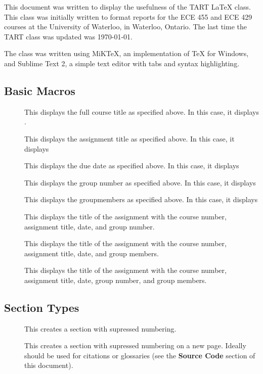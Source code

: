 \documentclass{technical_assignment_report}
\begin{document}
\fulltitle

\brief

This document was written to display the usefulness of the TART {\LaTeX} class. This class was initially written to format reports for the ECE 455 and ECE 429 courses at the University of Waterloo, in Waterloo, Ontario. The last time the TART class was updated was \today.


\environment

The class was written using MiKTeX, an implementation of {\TeX} for Windows, and Sublime Text 2, a simple text editor with tabs and syntax highlighting.



\subsection*{Basic Macros}
\begin{description}
\item[] This displays the full course title as specified above. In this case, it displays {\course}.
\item[] This displays the assignment title as specified above. In this case, it displays {\it\assignment}
\item[] This displays the due date as specified above. In this case, it displays {\duedate}
\item[] This displays the group number as specified above. In this case, it displays {\group}
\item[] This displays the groupmembers as specified above. In this case, it displays {\it\groupmem}
\item[] This displays the title of the assignment with the course number, assignment title, date, and group number.
\item[] This displays the title of the assignment with the course number, assignment title, date, and group members.
\item[] This displays the title of the assignment with the course number, assignment title, date, group number, and group members.
\end{description}

\subsection*{Section Types}
\begin{description}
\item[] This creates a section with supressed numbering.
\item[] This creates a section with supressed numbering on a new page. Ideally should be used for citations or glossaries (see the {\bf Source Code} section of this document).
\end{description}
\end{document}
